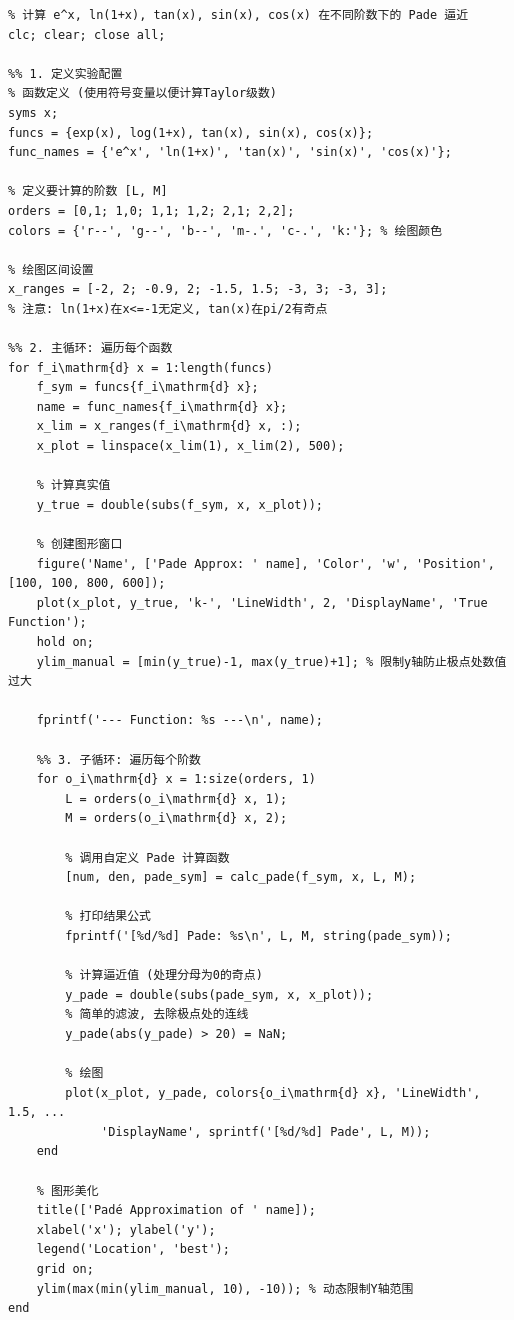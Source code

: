 \documentclass[UTF8, a4paper, 11pt]{ctexart}
\begin{document}
\begin{lstlisting}[caption={几个初等函数的有理逼近计算与拟合效果}]
%% 文件名：Pade Approximation.m
% 计算 e^x, ln(1+x), tan(x), sin(x), cos(x) 在不同阶数下的 Pade 逼近
clc; clear; close all;

%% 1. 定义实验配置
% 函数定义 (使用符号变量以便计算Taylor级数)
syms x;
funcs = {exp(x), log(1+x), tan(x), sin(x), cos(x)};
func_names = {'e^x', 'ln(1+x)', 'tan(x)', 'sin(x)', 'cos(x)'};

% 定义要计算的阶数 [L, M]
orders = [0,1; 1,0; 1,1; 1,2; 2,1; 2,2];
colors = {'r--', 'g--', 'b--', 'm-.', 'c-.', 'k:'}; % 绘图颜色

% 绘图区间设置
x_ranges = [-2, 2; -0.9, 2; -1.5, 1.5; -3, 3; -3, 3]; 
% 注意: ln(1+x)在x<=-1无定义, tan(x)在pi/2有奇点

%% 2. 主循环: 遍历每个函数
for f_i\mathrm{d} x = 1:length(funcs)
    f_sym = funcs{f_i\mathrm{d} x};
    name = func_names{f_i\mathrm{d} x};
    x_lim = x_ranges(f_i\mathrm{d} x, :);
    x_plot = linspace(x_lim(1), x_lim(2), 500);
    
    % 计算真实值
    y_true = double(subs(f_sym, x, x_plot));
    
    % 创建图形窗口
    figure('Name', ['Pade Approx: ' name], 'Color', 'w', 'Position', [100, 100, 800, 600]);
    plot(x_plot, y_true, 'k-', 'LineWidth', 2, 'DisplayName', 'True Function'); 
    hold on;
    ylim_manual = [min(y_true)-1, max(y_true)+1]; % 限制y轴防止极点处数值过大
    
    fprintf('--- Function: %s ---\n', name);
    
    %% 3. 子循环: 遍历每个阶数
    for o_i\mathrm{d} x = 1:size(orders, 1)
        L = orders(o_i\mathrm{d} x, 1);
        M = orders(o_i\mathrm{d} x, 2);
        
        % 调用自定义 Pade 计算函数
        [num, den, pade_sym] = calc_pade(f_sym, x, L, M);
        
        % 打印结果公式
        fprintf('[%d/%d] Pade: %s\n', L, M, string(pade_sym));
        
        % 计算逼近值 (处理分母为0的奇点)
        y_pade = double(subs(pade_sym, x, x_plot));
        % 简单的滤波, 去除极点处的连线
        y_pade(abs(y_pade) > 20) = NaN; 
        
        % 绘图
        plot(x_plot, y_pade, colors{o_i\mathrm{d} x}, 'LineWidth', 1.5, ...
             'DisplayName', sprintf('[%d/%d] Pade', L, M));
    end
    
    % 图形美化
    title(['Padé Approximation of ' name]);
    xlabel('x'); ylabel('y');
    legend('Location', 'best');
    grid on;
    ylim(max(min(ylim_manual, 10), -10)); % 动态限制Y轴范围
end


\end{lstlisting}
\end{document}
